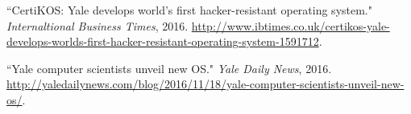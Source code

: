 \documentclass[a4paper, 10pt]{article}
\begin{document}
\begin{footnotesize}
\begin{thebibliography}{}
``CertiKOS: Yale develops world's first hacker-resistant operating system." \emph{Internaltional Business Times}, 2016.
\url{http://www.ibtimes.co.uk/certikos-yale-develops-worlds-first-hacker-resistant-operating-system-1591712}.

``Yale computer scientists unveil new OS." \emph{Yale Daily News}, 2016.
\url{http://yaledailynews.com/blog/2016/11/18/yale-computer-scientists-unveil-new-os/}.


\begin{comment}
\bibitem[7]{sel4}
G. Klein, K. Elphinstone, G. Heiser, J. Andronick,
D. Cock, P. Derrin, D. Elkaduwe, K. Engelhardt,
R. Kolanski, M. Norrish, T. Sewell, H. Tuch, and
S. Winwood. ``seL4: Formal verification of an OS
kernel." In 22nd ACM Symposium on Operating
Systems Principles (SOSP 09).

\bibitem[8]{fscq}
H. Chen, D. Ziegler, T. Chajed, A. Chlipala, M. F.
Kaashoek, and N. Zeldovich. ``Using Crash Hoare
logic for certifying the FSCQ file system." In
25th ACM Symposium on Operating System Principles
(SOSP 15).

\bibitem[9]{apsys}
S. Peters, A. Danis, K. Elphinstone, and G. Heiser.
``For a microkernel, a big lock is fine." In 
Asia Pacific Workshop on Systems (APSys 15).

\bibitem[10]{coq}
The Coq proof assistant. The Coq development team.  \url{http://coq.
inria.fr}.
\end{comment}



\end{thebibliography}
\end{footnotesize}
\end{document}
